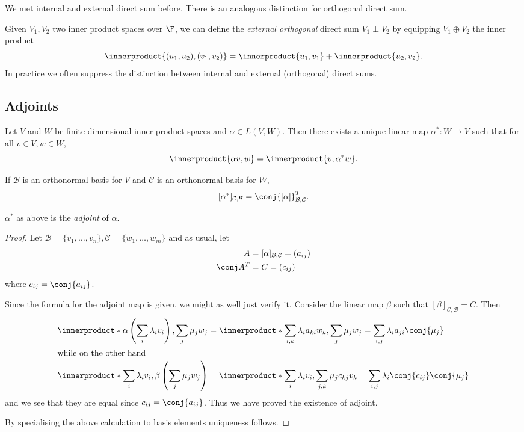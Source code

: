 \documentclass[a4paper]{article}
\newcommand*{\basis}{\mathcal}
\newcommand*{\ip}{\innerproduct}
\theoremstyle{definition}
\begin{document}
\begin{remark}
  We met internal and external direct sum before. There is an analogous distinction for orthogonal direct sum.

  Given \(V_1, V_2\) two inner product spaces over \(\F\), we can define the \emph{external orthogonal} direct sum \(V_1 \perp V_2\) by equipping \(V_1 \oplus V_2\) the inner product
  \[
    \ip{(u_1, u_2), (v_1, v_2)} = \ip{u_1, v_1} + \ip{u_2, v_2}.
  \]
  In practice we often suppress the distinction between internal and external (orthogonal) direct sums.
\end{remark}

\subsection{Adjoints}

\begin{proposition}
  Let \(V\) and \(W\) be finite-dimensional inner product spaces and \(\alpha \in L(V, W)\). Then there exists a unique linear map \(\alpha^*: W \to V\) such that for all \(v \in V, w \in W\),
  \[
    \ip{\alpha v, w} = \ip{v, \alpha^*w}.
  \]

  If \(\basis B\) is an orthonormal basis for \(V\) and \(\basis C\) is an orthonormal basis for \(W\),
  \[
    [\alpha^*]_{\basis C, \basis B} = \conj{[\alpha]}^T_{\basis B, \basis C}.
  \]
\end{proposition}

\begin{definition}[Adjoint]
  \(\alpha^*\) as above is the \emph{adjoint} of \(\alpha\).
\end{definition}

\begin{proof}
  Let \(\basis B = \{v_1, \dots, v_n\}, \basis C = \{w_1, \dots, w_m\}\) and as usual, let
  \begin{align*}
    A &= [\alpha]_{\basis B, \basis C} = (a_{ij}) \\
    \conj A^T &= C = (c_{ij})
  \end{align*}
  where \(c_{ij} = \conj{a_{ij}}\).

  Since the formula for the adjoint map is given, we might as well just verify it. Consider the linear map \(\beta\) such that \([\beta]_{\basis C, \basis B} = C\). Then
  \begin{align*}
    \ip*{\alpha \left( \sum_i \lambda_iv_i \right), \sum_j \mu_jw_j} &= \ip*{\sum_{i, k}\lambda_ia_{ki}w_k, \sum_j \mu_jw_j} = \sum_{i, j} \lambda_ia_{ji}\conj{\mu_j} \\
    \intertext{while on the other hand}
    \ip*{\sum_i \lambda_iv_i, \beta \left( \sum_j \mu_jw_j \right)} &= \ip*{\sum_i\lambda_iv_i, \sum_{j, k}\mu_jc_{kj}v_k}  = \sum_{i, j}\lambda_i \conj{c_{ij}}\conj{\mu_j} \\
  \end{align*}
  and we see that they are equal since \(c_{ij} = \conj{a_{ij}}\). Thus we have proved the existence of adjoint.

  By specialising the above calculation to basis elements uniqueness follows.
\end{proof}
\end{document}
